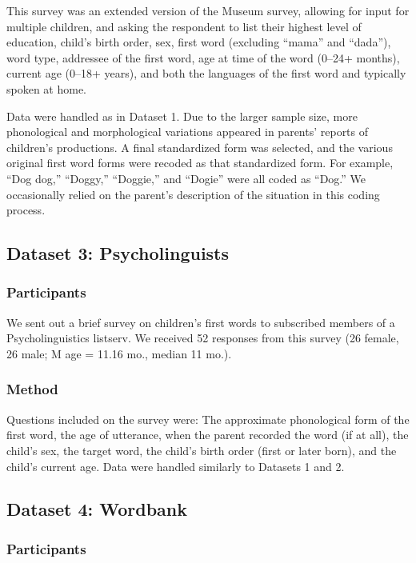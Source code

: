 \documentclass[10pt,letterpaper]{article}
\begin{document}
This survey was an extended version of the Museum survey, allowing for input for multiple children, and asking the respondent to list their highest level of education, child's birth order, sex, first word (excluding ``mama'' and ``dada''), word type, addressee of the first word, age at time of the word (0--24+ months), current age (0--18+ years), and both the languages of the first word and typically spoken at home.

Data were handled as in Dataset 1. Due to the larger sample size, more phonological and morphological variations appeared in parents' reports of children's productions. A final standardized form was selected, and the various original first word forms were recoded as that standardized form. For example, ``Dog dog,'' ``Doggy,'' ``Doggie,'' and ``Dogie'' were all coded as ``Dog.'' We occasionally relied on the parent's description of the situation in this coding process.

\subsection{Dataset 3: Psycholinguists }

\subsubsection{Participants}

We sent out a brief survey on children's first words to subscribed members of a Psycholinguistics listserv. We received 52 responses from this survey (26 female, 26 male; M age = 11.16 mo., median 11 mo.).

\subsubsection{Method}

Questions included on the survey were: The approximate phonological form of the first word, the age of utterance, when the parent recorded the word (if at all), the child's sex, the target word, the child's birth order (first or later born), and the child's current age. Data were handled similarly to Datasets 1 and 2. 

\subsection{Dataset 4: Wordbank}

\subsubsection{Participants}
\end{document}
